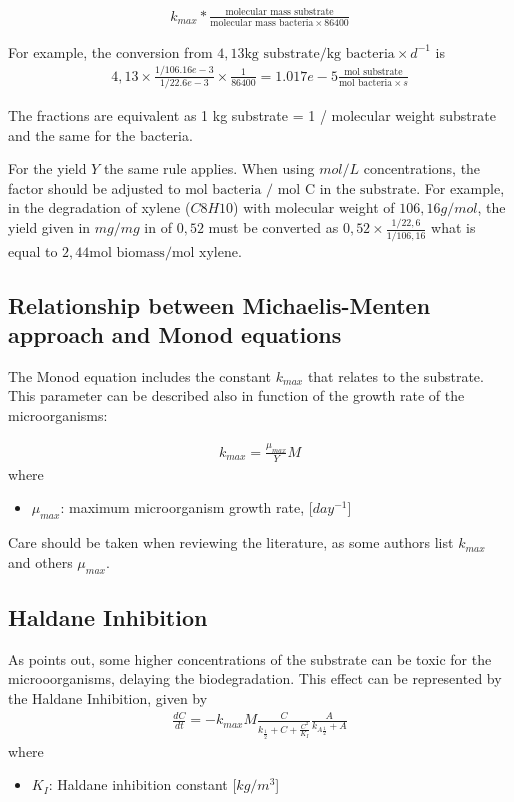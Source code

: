 \documentclass[12pt,twoside]{report}
\begin{document}
\begin{align}
k_{max} * \frac{\text{molecular mass substrate}}{\text{molecular mass bacteria} \times 86400 }
\end{align}

For example, the conversion from $4,13 \text{kg substrate}/\text{kg bacteria}\times d^{-1}$ is 
\begin{align}
4,13 \times \frac{1/106.16e-3}{1/22.6e-3} \times \frac{1}{86400} = 1.017e-5 \frac{\text{mol substrate}}{\text{mol bacteria}\times s}
\end{align} 

The fractions are equivalent as 1 kg substrate = 1 / molecular weight substrate and the same for the bacteria.

For the yield $Y$ the same rule applies. When using $mol/L$ concentrations, the factor should be adjusted to $\text{mol bacteria / mol C in the substrate}$. For example, in the degradation of xylene ($C8H10$) with molecular weight of $106,16 g/mol$, the yield given in $mg/mg$ in \cite{schirmer} of $0,52$ must be converted as $0,52 \times \frac{1/22,6}{1/106,16}$ what is equal to $2,44 \text{mol biomass}/\text{mol xylene}$. 

\subsection{Relationship between Michaelis-Menten approach and Monod equations}
The Monod equation includes the constant $k_{max}$ that relates to the substrate. This parameter can be described also in function of the growth rate of the microorganisms:

\begin{align}
k_{max} = \frac{\mu_{max}}{Y}M
\end{align}
where
\begin{itemize}
\item $\mu_{max}$: maximum microorganism growth rate, [$day^{-1}$]
\end{itemize}
Care should be taken when reviewing the literature, as some authors list $k_{max}$ and others $\mu_{max}$.

\subsection{Haldane Inhibition}
As \cite{schirmer_relative-least-squares_1999} points out, some higher concentrations of the substrate can be toxic for the microoorganisms, delaying the biodegradation. This effect can be represented by the Haldane Inhibition, given by 
\begin{align}
\frac{dC}{dt} = - k_{max} M \frac{C}{k_{\frac{1}{2}} + C + \frac{C^2}{K_{I}}}\frac{A}{k_{A\frac{1}{2}} + A}
\end{align}
where
\begin{itemize}
\item $K_{I}$: Haldane inhibition constant [$kg/m^3$]
\end{itemize}
\end{document}
